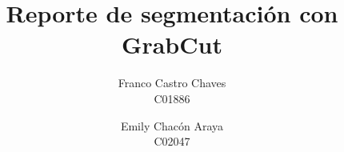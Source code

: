 \documentclass[11pt,a4paper]{article}
\title{Reporte de segmentación con GrabCut}
\author{Franco Castro Chaves\\C01886 \and Emily Chacón Araya\\C02047}
\date{}
\begin{document}
\maketitle

\begin{abstract}

\end{abstract}

\tableofcontents
\newpage









%

\FloatBarrier


\clearpage

\end{document}
